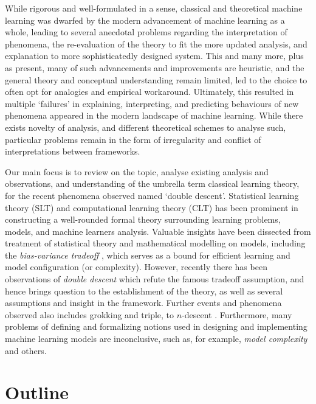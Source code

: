 \documentclass[
  journal=largetwo,
  year=2025,
  volume=37,
]{cup-journal}
\begin{document}
While rigorous and well-formulated in a sense, classical and theoretical machine learning was dwarfed by the modern advancement of machine learning as a whole, leading to several anecdotal problems regarding the interpretation of phenomena, the re-evaluation of the theory to fit the more updated analysis, and explanation to more sophisticatedly designed system. This and many more, plus as present, many of such advancements and improvements are heuristic, and the general theory and conceptual understanding remain limited, led to the choice to often opt for analogies and empirical workaround. Ultimately, this resulted in multiple `failures' in explaining, interpreting, and predicting behaviours of new phenomena appeared in the modern landscape of machine learning. While there exists novelty of analysis, and different theoretical schemes to analyse such, particular problems remain in the form of irregularity and conflict of interpretations between frameworks. 

Our main focus is to review on the topic, analyse existing analysis and observations, and understanding of the umbrella term classical learning theory, for the recent phenomena observed named `double descent'. Statistical learning theory (SLT) and computational learning theory (CLT) \cite{Vapnik1999-VAPTNO,10.5555/2371238,10.5555/2621980,STL_Hajek_Maxim_2021,bousquet2020theoryuniversallearning} has been prominent in constructing a well-rounded formal theory surrounding learning problems, models, and machine learners analysis. Valuable insights have been dissected from treatment of statistical theory and mathematical modelling on models, including the \textit{bias-variance tradeoff} \cite{6797087,Domingos2000AUB}, which serves as a bound for efficient learning and model configuration (or complexity). However, recently there has been observations of \textit{double descent} \cite{belkin_reconciling_2019,schaeffer_double_2023,nakkiran_deep_2019,lafon_understanding_2024} which refute the famous tradeoff assumption, and hence brings question to the establishment of the theory, as well as several assumptions and insight in the framework. Further events and phenomena observed also includes grokking and triple, to $n$-descent \cite{davies_unifying_2023,d_ascoli_triple_2020}. Furthermore, many problems of defining and formalizing notions used in designing and implementing machine learning models are inconclusive, such as, for example, \textit{model complexity} and others. 

\section{Outline}
\end{document}
